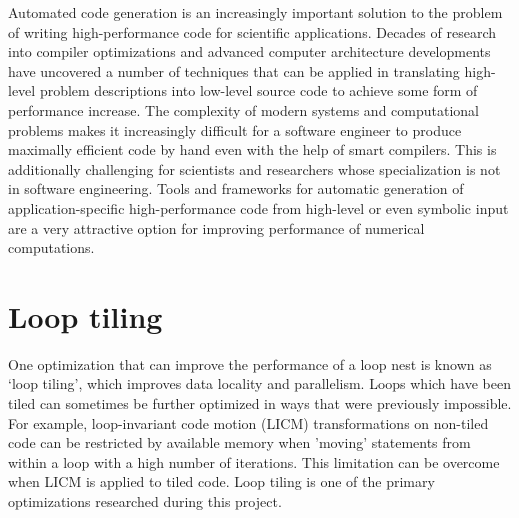 \documentclass[a4paper,12pt,twoside]{report}
\begin{document}
Automated code generation is an increasingly important solution to the problem of writing high-performance code
for scientific applications. Decades of research into compiler optimizations and advanced computer architecture developments
have uncovered a number of techniques that can be applied in translating high-level problem descriptions into low-level source code
to achieve some form of performance increase. The complexity of modern systems and computational problems makes it increasingly 
difficult for a software engineer to produce maximally efficient code by hand even with the help of smart
compilers. This is additionally challenging for scientists and researchers whose specialization is not in software engineering. Tools
and frameworks for automatic generation of application-specific high-performance code from high-level or even symbolic input are a very
attractive option for improving performance of numerical computations.


\section{Loop tiling}
One optimization that can improve the performance of a loop nest is known as `loop tiling', which improves data locality and parallelism.
Loops which have been tiled can sometimes be further optimized in ways that were previously impossible. For example, 
loop-invariant code motion (LICM) transformations on non-tiled code can be restricted by available memory when 'moving'
statements from within a loop with a high number of iterations. This limitation can be overcome when LICM is applied to tiled code.
Loop tiling is one of the primary optimizations researched during this project.
\end{document}
